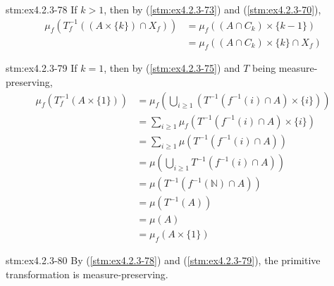 \begin{statement}{stm:ex4.2.3-78}
If $k > 1$, then by (\ref{stm:ex4.2.3-73}) and (\ref{stm:ex4.2.3-70}),
\begin{align*}
\mu_f(T_f^{-1}((A \times \{k\}) \cap X_f)) &= \mu_f((A \cap C_k) \times \{k-1\}) \\
&= \mu_f((A \cap C_k) \times \{k\} \cap X_f)
\end{align*}
\end{statement}

\begin{statement}{stm:ex4.2.3-79}
If $k = 1$, then by (\ref{stm:ex4.2.3-75}) and $T$ being measure-preserving,
\begin{align*}
\mu_f(T_f^{-1}(A \times \{1\})) &= \mu_f\left(\bigcup_{i \ge 1} (T^{-1}(f^{-1}(i) \cap A) \times \{i\})\right) \\
&= \sum_{i \ge 1} \mu_f(T^{-1}(f^{-1}(i) \cap A) \times \{i\}) \\
&= \sum_{i \ge 1} \mu(T^{-1}(f^{-1}(i) \cap A)) \\
&= \mu\left(\bigcup_{i \ge 1} T^{-1}(f^{-1}(i) \cap A)\right) \\
&= \mu(T^{-1}(f^{-1}(\mathbb{N}) \cap A)) \\
&= \mu(T^{-1}(A)) \\
&= \mu(A) \\
&= \mu_f(A \times \{1\})
\end{align*}
\end{statement}


\begin{statement}{stm:ex4.2.3-80}
By (\ref{stm:ex4.2.3-78}) and (\ref{stm:ex4.2.3-79}), the primitive transformation is measure-preserving.
\end{statement}